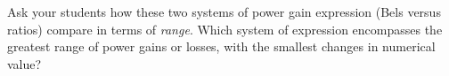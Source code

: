 





Ask your students how these two systems of power gain expression (Bels versus ratios) compare in terms of {\it range}.  Which system of expression encompasses the greatest range of power gains or losses, with the smallest changes in numerical value?




